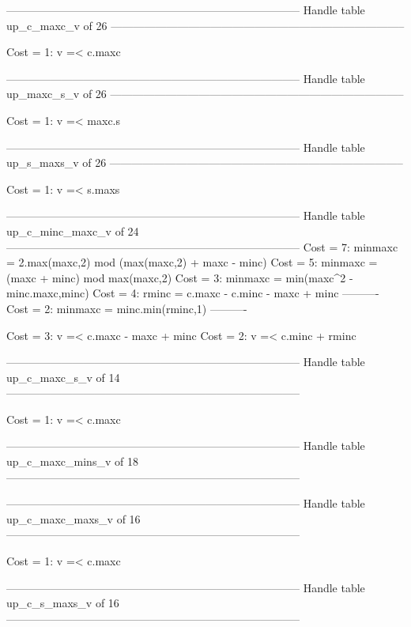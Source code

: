 --------------------------------------------------------------------------------
Handle table up_c_maxc_v of 26
--------------------------------------------------------------------------------

Cost =  1:  v =< c.maxc

--------------------------------------------------------------------------------
Handle table up_maxc_s_v of 26
--------------------------------------------------------------------------------

Cost =  1:  v =< maxc.s

--------------------------------------------------------------------------------
Handle table up_s_maxs_v of 26
--------------------------------------------------------------------------------

Cost =  1:  v =< s.maxs

--------------------------------------------------------------------------------
Handle table up_c_minc_maxc_v of 24
--------------------------------------------------------------------------------
Cost =  7:  minmaxc = 2.max(maxc,2) mod (max(maxc,2) + maxc - minc)
Cost =  5:  minmaxc = (maxc + minc) mod max(maxc,2)
Cost =  3:  minmaxc = min(maxc^2 - minc.maxc,minc)
Cost =  4:  rminc   = c.maxc - c.minc - maxc + minc
----------
Cost =  2:  minmaxc = minc.min(rminc,1)
----------

Cost =  3:  v =< c.maxc - maxc + minc
Cost =  2:  v =< c.minc + rminc

--------------------------------------------------------------------------------
Handle table up_c_maxc_s_v of 14
--------------------------------------------------------------------------------

Cost =  1:  v =< c.maxc

--------------------------------------------------------------------------------
Handle table up_c_maxc_mins_v of 18
--------------------------------------------------------------------------------


--------------------------------------------------------------------------------
Handle table up_c_maxc_maxs_v of 16
--------------------------------------------------------------------------------

Cost =  1:  v =< c.maxc

--------------------------------------------------------------------------------
Handle table up_c_s_maxs_v of 16
--------------------------------------------------------------------------------

